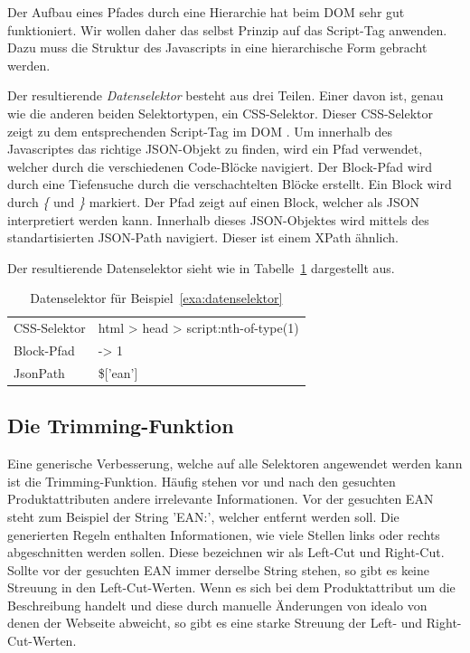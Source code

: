 Der Aufbau eines Pfades durch eine Hierarchie hat beim DOM sehr gut funktioniert.
Wir wollen daher das selbst Prinzip auf das Script-Tag anwenden.
Dazu muss die Struktur des Javascripts in eine hierarchische Form gebracht werden.

Der resultierende \textit{Datenselektor} besteht aus drei Teilen.
Einer davon ist, genau wie die anderen beiden Selektortypen, ein CSS-Selektor.
Dieser CSS-Selektor zeigt zu dem entsprechenden Script-Tag im DOM .
Um innerhalb des Javascriptes das richtige JSON-Objekt zu finden, wird ein Pfad verwendet, welcher durch die
verschiedenen Code-Blöcke navigiert.
Der Block-Pfad wird durch eine Tiefensuche durch die verschachtelten Blöcke erstellt.
Ein Block wird durch \textit{\{} und \textit{\}} markiert.
Der Pfad zeigt auf einen Block, welcher als JSON interpretiert werden kann.
Innerhalb dieses JSON-Objektes wird mittels des standartisierten JSON-Path navigiert.
Dieser ist einem XPath ähnlich.

Der resultierende Datenselektor sieht wie in Tabelle~\ref{tab:datenselektor} dargestellt aus.

\begin{table}[h]
    \centering
    \begin{tabular}{ l | l }
        CSS-Selektor &  html > head > script:nth-of-type(1)\\
        Block-Pfad   &  -> 1\\
        JsonPath     &  \$['ean']
    \end{tabular}
    \caption{Datenselektor für Beispiel~\ref{exa:datenselektor}}
    \label{tab:datenselektor}
\end{table}

\subsection{Die Trimming-Funktion}
\label{subsec:trimming-funktion}

Eine generische Verbesserung, welche auf alle Selektoren angewendet werden kann ist die Trimming-Funktion.
Häufig stehen vor und nach den gesuchten Produktattributen andere irrelevante Informationen.
Vor der gesuchten EAN steht zum Beispiel der String 'EAN:\textvisiblespace', welcher entfernt werden soll.
Die generierten Regeln enthalten Informationen, wie viele Stellen links oder rechts abgeschnitten werden sollen.
Diese bezeichnen wir als Left-Cut und Right-Cut.
Sollte vor der gesuchten EAN immer derselbe String stehen, so gibt es keine Streuung in den Left-Cut-Werten.
Wenn es sich bei dem Produktattribut um die Beschreibung handelt und diese durch manuelle Änderungen von idealo von
denen der Webseite abweicht, so gibt es eine starke Streuung der Left- und Right-Cut-Werten.

